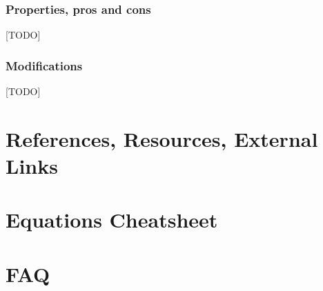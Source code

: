\documentclass{article}
\begin{document}
\subsubsection*{Properties, pros and cons}
[TODO]

\subsubsection*{Modifications}
[TODO]


\newpage
{}
\section*{References, Resources, External Links}

\newpage
{}
\section*{Equations Cheatsheet}

\newpage
{}
\section*{FAQ}
\end{document}
